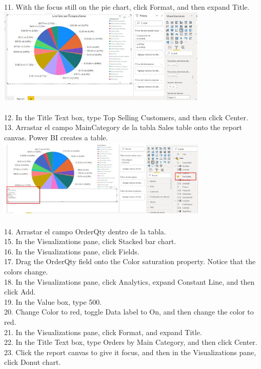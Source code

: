 \documentclass[preprint,12pt]{elsarticle}
\begin{document}
\begin{itemize}
			\\ 11. With the focus still on the pie chart, click Format, and then expand Title.
				\\ \includegraphics[width=10cm]{./IMAGENES/4.11} \\
			\\ 12. In the Title Text box, type Top Selling Customers, and then click Center.
			\\ 13. Arrastar el campo MainCategory de la tabla Sales table onto the report canvas. Power BI creates a table.
				\\ \includegraphics[width=10cm]{./IMAGENES/4.13} \\
			\\ 14. Arrastar el campo OrderQty dentro de la tabla.
			\\ 15. In the Visualizations pane, click Stacked bar chart.
			\\ 16. In the Visualizations pane, click Fields.
		\\ 	17. Drag the OrderQty field onto the Color saturation property. Notice that the colors change.
			\\ 18. In the Visualizations pane, click Analytics, expand Constant Line, and then click Add.
			\\ 19. In the Value box, type 500.
			\\ 20. Change Color to red, toggle Data label to On, and then change the color to red.
			\\ 21. In the Visualizations pane, click Format, and expand Title.
			\\ 22. In the Title Text box, type Orders by Main Category, and then click Center.
			\\ 23. Click the report canvas to give it focus, and then in the Visualizations pane, click Donut chart.

\end{itemize}
\end{document}
